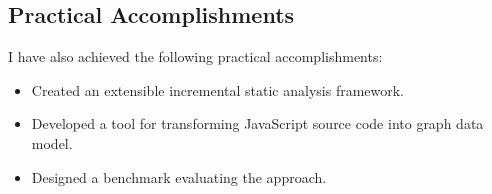 \subsection{Practical Accomplishments}
I have also achieved the following practical accomplishments:

\begin{itemize}[topsep=0pt]
	\item Created an extensible incremental static analysis framework.
	\item Developed a tool for transforming JavaScript source code into graph data model.
	\item Designed a benchmark evaluating the approach.
\end{itemize}
